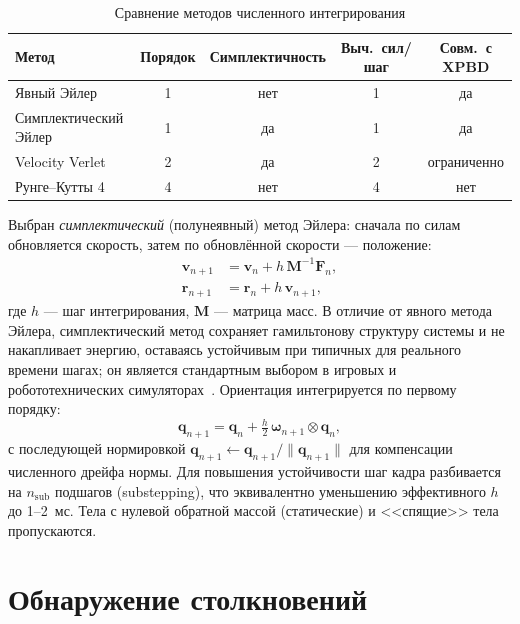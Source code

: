 \begin{table}[ht]
  \centering
  \caption{Сравнение методов численного интегрирования}
  \label{tab:integrators}
  \small
  \begin{tabular}{lcccc}
    \toprule
    Метод & Порядок & Симплектичность & Выч.\ сил/шаг & Совм.\ с XPBD \\
    \midrule
    Явный Эйлер          & 1 & нет & 1 & да \\
    Симплектический Эйлер & 1 & да  & 1 & да \\
    Velocity Verlet       & 2 & да  & 2 & ограниченно \\
    Рунге--Кутты 4        & 4 & нет & 4 & нет \\
    \bottomrule
  \end{tabular}
\end{table}

Выбран \emph{симплектический} (полунеявный) метод Эйлера: сначала по силам
обновляется скорость, затем по обновлённой скорости --- положение:
\begin{align}
  \mathbf{v}_{n+1} &= \mathbf{v}_n + h\,\mathbf{M}^{-1}\mathbf{F}_n, \\
  \mathbf{r}_{n+1} &= \mathbf{r}_n + h\,\mathbf{v}_{n+1},
  \label{eq:symplectic}
\end{align}
где $h$ --- шаг интегрирования, $\mathbf{M}$ --- матрица масс. В отличие от
явного метода Эйлера, симплектический метод сохраняет гамильтонову структуру
системы и не накапливает энергию, оставаясь устойчивым при типичных для
реального времени шагах; он является стандартным выбором в игровых и
робототехнических симуляторах~\cite{catto2005iterative}. Ориентация
интегрируется по первому порядку:
\begin{equation}
  \mathbf{q}_{n+1} = \mathbf{q}_n +
  \tfrac{h}{2}\,\boldsymbol{\omega}_{n+1}\otimes\mathbf{q}_n,
  \label{eq:quat-integrate}
\end{equation}
с последующей нормировкой $\mathbf{q}_{n+1} \leftarrow \mathbf{q}_{n+1} /
\|\mathbf{q}_{n+1}\|$ для компенсации численного дрейфа нормы. Для повышения
устойчивости шаг кадра разбивается на $n_{\text{sub}}$ подшагов (substepping),
что эквивалентно уменьшению эффективного $h$ до 1--2~мс. Тела с нулевой
обратной массой (статические) и <<спящие>> тела пропускаются.

\section{Обнаружение столкновений}

